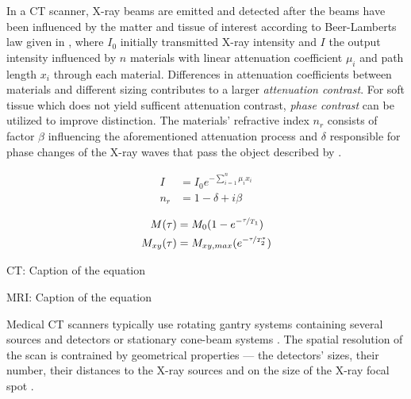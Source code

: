         In a \ac{CT} scanner, X-ray beams are emitted and detected after the beams have been influenced by the matter and tissue of interest according to Beer-Lamberts law given in , where $I_0$ initially transmitted X-ray intensity and $I$ the output intensity influenced by $n$ materials with linear attenuation coefficient $\mu_i$ and path length $x_i$ through each material. Differences in attenuation coefficients between materials and different sizing contributes to a larger \emph{attenuation contrast}. For soft tissue which does not yield sufficent attenuation contrast, \emph{phase contrast} can be utilized to improve distinction.
        The materials' refractive index $n_r$ consists of factor $\beta$ influencing the aforementioned attenuation process and $\delta$ responsible for phase changes of the X-ray waves that pass the object described by  \citep{withers2021x}.

        \begin{minipage}[b]{.45\textwidth}
            \begin{align}
                I &= I_0 e^{-\sum_{i=1}^{n} \mu_i x_i} \label{eq:beer_lambert} \\
                n_r &= 1-\delta + i\beta \label{eq:refractive_index}
            \end{align}
        \end{minipage}
        \hfill
        \begin{minipage}[b]{.45\textwidth}
            \begin{align}
                M(\tau) &= M_0(1-e^{-\nicefrac{\tau}{T_1}}) \label{eq:T1decay}\\
                M_{xy}(\tau) &= M_{xy,max}(e^{-\nicefrac{\tau}{T_2^*}})\label{eq:T2decay}
            \end{align}
        \end{minipage}
        \vspace{6pt}

        \begin{minipage}[t]{.45\textwidth}
            \ac{CT}: Caption of the equation \citep{withers2021x}
        \end{minipage}
        \hfill
        \begin{minipage}[t]{.45\textwidth}
            \ac{MRI}: Caption of the equation \citep{dale2015mri}
        \end{minipage}
        \vspace{6pt}

        Medical \ac{CT} scanners typically use rotating gantry systems containing several sources and detectors or stationary cone-beam systems \citep{withers2021x}. The spatial resolution of the scan is contrained by geometrical properties --- the detectors' sizes, their number, their distances to the X-ray sources and on the size of the X-ray focal spot \citep{withers2021x}.

